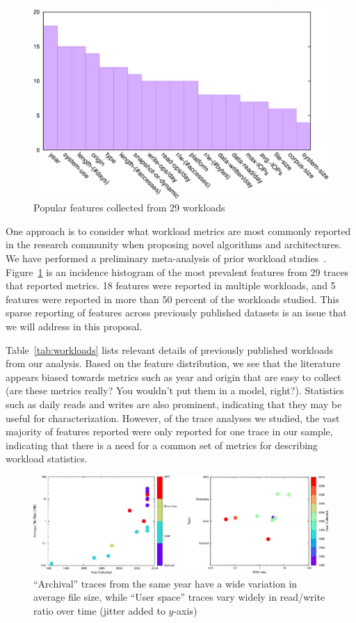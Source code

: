 \begin{figure}
\centering
\includegraphics[width=.7\linewidth]{feature_hist.eps}
\caption{Popular features collected from 29 workloads}
\label{fig:features}
\end{figure}
One approach is to consider what workload metrics are most commonly reported in
the research community when proposing novel algorithms and architectures.
We have performed a preliminary meta-analysis
of prior workload studies~\cite{wildani2015case}. Figure~\ref{fig:features} is an incidence histogram of the most
prevalent features from 29 traces that reported metrics.  18 features were reported in multiple workloads, and 5 features were
reported in more than 50 percent of the workloads studied. This sparse reporting of features across previously published datasets is an issue that we will address in this proposal.

Table~\ref{tab:workloads} lists relevant details of previously published
workloads from our analysis. Based on the feature distribution, we see that the literature
appears biased towards metrics such as year and origin that are easy to collect (are these metrics really? You wouldn't put them in a model, right?).
Statistics such as daily reads and writes are also prominent, indicating that
they may be useful for characterization. However,
of the trace analyses we studied, the vast majority of features reported were
only reported for one trace in our sample, indicating that there is a need for a
common set of metrics for describing workload statistics.

\begin{figure}
\centering
\includegraphics[width=.95\linewidth]{hack.eps}
\caption{``Archival'' traces from the same year have a wide variation in average
file size, while ``User space'' traces vary widely in read/write ratio over time (jitter
added to $y$-axis)}
\label{fig:hack}
\end{figure}

